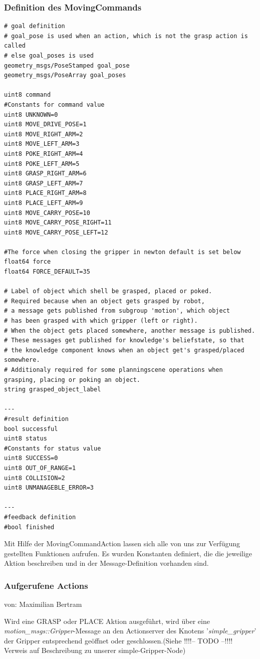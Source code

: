 \documentclass{suturo}
\makeatletter
\newcommand{\chapterauthor}[1]{%
  {\parindent0pt\vspace*{-27pt}%
  \linespread{0}\small\begin{flushright}von: #1\end{flushright}%
  \par\nobreak\vspace*{0pt}}
  \@afterheading%
}
\makeatother
\begin{document}
\subsubsection*{Definition des MovingCommands}
\begin{verbatim}
# goal definition
# goal_pose is used when an action, which is not the grasp action is called
# else goal_poses is used
geometry_msgs/PoseStamped goal_pose
geometry_msgs/PoseArray goal_poses

uint8 command
#Constants for command value
uint8 UNKNOWN=0
uint8 MOVE_DRIVE_POSE=1
uint8 MOVE_RIGHT_ARM=2
uint8 MOVE_LEFT_ARM=3
uint8 POKE_RIGHT_ARM=4
uint8 POKE_LEFT_ARM=5
uint8 GRASP_RIGHT_ARM=6
uint8 GRASP_LEFT_ARM=7
uint8 PLACE_RIGHT_ARM=8
uint8 PLACE_LEFT_ARM=9
uint8 MOVE_CARRY_POSE=10
uint8 MOVE_CARRY_POSE_RIGHT=11
uint8 MOVE_CARRY_POSE_LEFT=12

#The force when closing the gripper in newton default is set below
float64 force
float64 FORCE_DEFAULT=35

# Label of object which shell be grasped, placed or poked.
# Required because when an object gets grasped by robot,
# a message gets published from subgroup 'motion', which object
# has been grasped with which gripper (left or right).
# When the object gets placed somewhere, another message is published.
# These messages get published for knowledge's beliefstate, so that
# the knowledge component knows when an object get's grasped/placed somewhere.
# Additionaly required for some planningscene operations when grasping, placing or poking an object.
string grasped_object_label

---
#result definition
bool successful
uint8 status
#Constants for status value
uint8 SUCCESS=0
uint8 OUT_OF_RANGE=1
uint8 COLLISION=2
uint8 UNMANAGEBLE_ERROR=3

---
#feedback definition
#bool finished
\end{verbatim}

Mit Hilfe der MovingCommandAction lassen sich alle von uns zur Verfügung gestellten Funktionen aufrufen. Es wurden Konstanten definiert, die die jeweilige Aktion beschreiben und in der Message-Definition vorhanden sind.

\subsubsection{Aufgerufene Actions}
\chapterauthor{Maximilian Bertram}
Wird eine GRASP oder PLACE Aktion ausgeführt, wird über eine \\
\textit{motion\_msgs::Gripper}-Message an den Actionserver des Knotens '\textit{simple\_gripper}' der Gripper entsprechend geöffnet oder geschlossen.(Siehe !!!!-- TODO --!!!! Verweis auf Beschreibung zu unserer simple-Gripper-Node)\\
\end{document}

